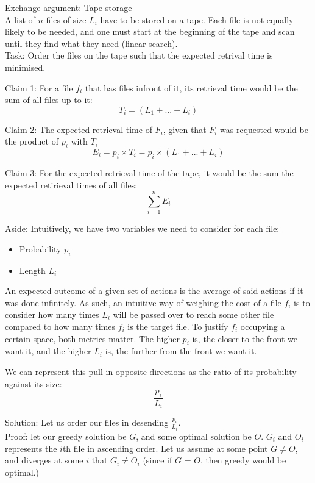 \documentclass[journal, letterpaper]{IEEEtran}
\begin{document}
\begin{example}{Exchange argument: Tape storage}\\
    A list of $n$ files of size $L_i$ have to be stored on a tape. Each file is not
    equally likely to be needed, and one must start at the beginning of the tape and scan
    until they find what they need (linear search).\\

    Task: Order the files on the tape such that the expected retrival time is minimised.

    Claim 1: For a file $f_i$ that has files infront of it, its
    retrieval time would be the sum of all files up to it: $$T_i = (L_1 + ... + L_{i})$$ 

    Claim 2: The expected retrieval time of $F_i$, given that $F_i$ was requested
    would be the product of $p_i$ with $T_i$
    $$E_i = p_i \times T_i = p_i \times (L_1 + ... + L_{i})$$

    Claim 3: For the expected retrieval time of the tape, it would be the sum the expected
    retirieval times of all files: $$\sum_{i=1}^{n} E_i$$

    Aside: Intuitively, we have two variables we need to consider for each file:
    \begin{itemize}
        \item Probability $p_i$ 
        \item Length $L_i$
    \end{itemize}
    An expected outcome of a given set of actions is the average of said actions if it was
    done infinitely. As such, an intuitive way of weighing the cost of a file
    $f_i$ is to consider how many times $L_i$ will be passed over to reach some
    other file compared to how many times $f_i$ is the target file. To justify $f_i$
    occupying a certain space, both metrics matter. The higher $p_i$ is, the closer to the
    front we want it, and the higher $L_i$ is, the further from the front we want it.

    We can represent this pull in opposite directions as the ratio of its probability against its size:
    $$\frac{p_i}{L_i}$$

    Solution: Let us order our files in desending $\frac{p_i}{L_i}$.\\

    Proof: let our greedy solution be $G$, and some optimal solution be $O$. $G_i$ and
    $O_i$ represents the $i$th file in ascending order. Let us assume at some point $G
    \neq O$, and diverges at some $i$ that $G_i \neq O_i$ (since if $G$ = $O$, then greedy
    would be optimal.)


\end{example}
\end{document}
